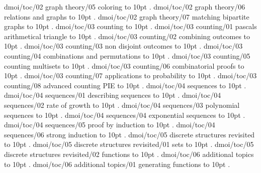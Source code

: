 \smallskip
dmoi/toc/02 graph theory/05 coloring \leaders\hbox to 10pt {\hss.\hss}  \hfill {}
\smallskip
dmoi/toc/02 graph theory/06 relations and graphs \leaders\hbox to 10pt {\hss.\hss}  \hfill {}
\smallskip
dmoi/toc/02 graph theory/07 matching bipartite graphs \leaders\hbox to 10pt {\hss.\hss}  \hfill {}
\smallskip
dmoi/toc/03 counting \leaders\hbox to 10pt {\hss.\hss}  \hfill {}
\smallskip
dmoi/toc/03 counting/01 pascals arithmetical triangle \leaders\hbox to 10pt {\hss.\hss}  \hfill {}
\smallskip
dmoi/toc/03 counting/02 combining outcomes \leaders\hbox to 10pt {\hss.\hss}  \hfill {}
\smallskip
dmoi/toc/03 counting/03 non disjoint outcomes \leaders\hbox to 10pt {\hss.\hss}  \hfill {}
\smallskip
dmoi/toc/03 counting/04 combinations and permutations \leaders\hbox to 10pt {\hss.\hss}  \hfill {}
\smallskip
dmoi/toc/03 counting/05 counting multisets \leaders\hbox to 10pt {\hss.\hss}  \hfill {}
\smallskip
dmoi/toc/03 counting/06 combinatorial proofs \leaders\hbox to 10pt {\hss.\hss}  \hfill {}
\smallskip
dmoi/toc/03 counting/07 applications to probability \leaders\hbox to 10pt {\hss.\hss}  \hfill {}
\smallskip
dmoi/toc/03 counting/08 advanced counting PIE \leaders\hbox to 10pt {\hss.\hss}  \hfill {}
\smallskip
dmoi/toc/04 sequences \leaders\hbox to 10pt {\hss.\hss}  \hfill {}
\smallskip
dmoi/toc/04 sequences/01 describing sequences \leaders\hbox to 10pt {\hss.\hss}  \hfill {}
\smallskip
dmoi/toc/04 sequences/02 rate of growth \leaders\hbox to 10pt {\hss.\hss}  \hfill {}
\smallskip
dmoi/toc/04 sequences/03 polynomial sequences \leaders\hbox to 10pt {\hss.\hss}  \hfill {}
\smallskip
dmoi/toc/04 sequences/04 exponential sequences \leaders\hbox to 10pt {\hss.\hss}  \hfill {}
\smallskip
dmoi/toc/04 sequences/05 proof by induction \leaders\hbox to 10pt {\hss.\hss}  \hfill {}
\smallskip
dmoi/toc/04 sequences/06 strong induction \leaders\hbox to 10pt {\hss.\hss}  \hfill {}
\smallskip
dmoi/toc/05 discrete structures revisited \leaders\hbox to 10pt {\hss.\hss}  \hfill {}
\smallskip
dmoi/toc/05 discrete structures revisited/01 sets \leaders\hbox to 10pt {\hss.\hss}  \hfill {}
\smallskip
dmoi/toc/05 discrete structures revisited/02 functions \leaders\hbox to 10pt {\hss.\hss}  \hfill {}
\smallskip
dmoi/toc/06 additional topics \leaders\hbox to 10pt {\hss.\hss}  \hfill {}
\smallskip
dmoi/toc/06 additional topics/01 generating functions \leaders\hbox to 10pt {\hss.\hss}  \hfill {}
\smallskip
